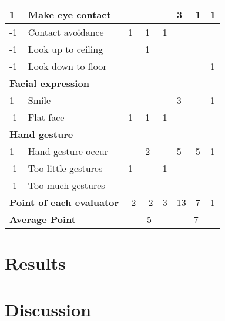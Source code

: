 \begin{table}[]
\begin{tabular}{|l|l|l|l|l|l|l|l|}
1 & Make eye contact &  &  &  & 3 & 1 & 1 \\ \hline
-1 & Contact avoidance & 1 & 1 & 1 &  &  &  \\ \hline
-1 & Look up to ceiling &  & 1 &  &  &  &  \\ \hline
-1 & Look down to floor &  &  &  &  &  & 1 \\ \hline
\multicolumn{8}{|l|}{\cellcolor[HTML]{F2F2F2}\textbf{Facial expression}} \\ \hline
1 & Smile &  &  &  & 3 &  & 1 \\ \hline
-1 & Flat face & 1 & 1 & 1 &  &  &  \\ \hline
\multicolumn{8}{|l|}{\cellcolor[HTML]{F2F2F2}\textbf{Hand gesture}} \\ \hline
1 & Hand gesture occur &  & 2 &  & 5 & 5 & 1 \\ \hline
-1 & Too little gestures & 1 &  & 1 &  &  &  \\ \hline
-1 & Too much gestures &  &  &  &  &  &  \\ \hline
\multicolumn{2}{|l|}{\textbf{Point of each evaluator}} & -2 & -2 & 3 & 13 & 7 & 1 \\ \hline
\multicolumn{2}{|l|}{\textbf{Average Point}} & \multicolumn{3}{c|}{-5} & \multicolumn{3}{c|}{7} \\ \hline
\end{tabular}
\end{table}
\section{Results}

\section{Discussion}
